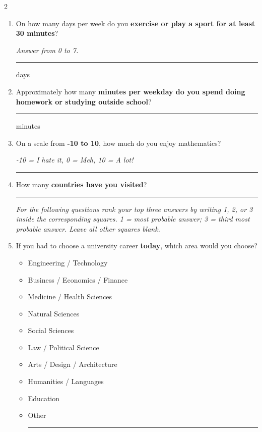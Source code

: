 \begin{minipage}{\dimexpr\textwidth+0.5cm\relax}
\begin{multicols}{2}
\begin{enumerate}
				\item On how many days per week do you \textbf{exercise or play a sport for at least 30 minutes}?
				
				\textit{Answer from 0 to 7.}
				
				{\centering
					\rule{3cm}{0.4pt} days\par
				}
				
				\item Approximately how many \textbf{minutes per weekday do you spend doing homework or studying outside school}?
				
				{\centering
					\rule{3cm}{0.4pt} minutes\par
				}
				
				\item On a scale from \textbf{-10 to 10}, how much do you enjoy mathematics?
				
				{\centering
					\textit{-10 = I hate it, 0 = Meh, 10 = A lot!}\\
					
					\rule{3cm}{0.4pt}\par
				}
				
				\item How many \textbf{countries have you visited}?
				
				{\centering
					\rule{3cm}{0.4pt}\par
				}
				
				\begin{center}
					\textit{For the following questions rank your top three answers by writing 1, 2, or 3 inside the corresponding squares. 1 = most probable answer; 3 = third most probable answer. Leave all other squares blank.}
				\end{center}
				
				\item If you had to choose a university career \textbf{today}, which area would you choose?
				
				\vspace{3cm}
				\begin{itemize}[label={\raisebox{-0.2ex}{\huge$\square$}}, leftmargin=2em]
					\item Engineering / Technology
					\item Business / Economics / Finance
					\item Medicine / Health Sciences
					\item Natural Sciences
					\item Social Sciences
					\item Law / Political Science
					\item Arts / Design / Architecture
					\item Humanities / Languages
					\item Education
					\item Other \rule{4cm}{0.4pt}
				\end{itemize}
				

\end{enumerate}
\end{multicols}
\end{minipage}
